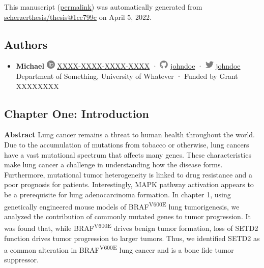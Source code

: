 This manuscript
(\href{https://scherzerthesis.github.io/thesis/v/1cc799cb76b18c366955ca819339505f0e3d53de/}{permalink})
was automatically generated
from \href{https://github.com/scherzerthesis/thesis/tree/1cc799cb76b18c366955ca819339505f0e3d53de}{scherzerthesis/thesis@1cc799c}
on April 5, 2022.

\hypertarget{authors}{%
\subsection{Authors}\label{authors}}

\begin{itemize}
\tightlist
\item
  \textbf{Michael}
  \includegraphics[width=0.16667in,height=0.16667in]{images/orcid.svg}
  \href{https://orcid.org/XXXX-XXXX-XXXX-XXXX}{XXXX-XXXX-XXXX-XXXX}
  · \includegraphics[width=0.16667in,height=0.16667in]{images/github.svg}
  \href{https://github.com/johndoe}{johndoe}
  · \includegraphics[width=0.16667in,height=0.16667in]{images/twitter.svg}
  \href{https://twitter.com/johndoe}{johndoe}
  Department of Something, University of Whatever
  · Funded by Grant XXXXXXXX
\end{itemize}

\hypertarget{chapter-one-introduction}{%
\subsection{Chapter One: Introduction}\label{chapter-one-introduction}}

\textbf{Abstract}
Lung cancer remains a threat to human health throughout the world. Due to the accumulation of mutations from tobacco or otherwise, lung cancers have a vast mutational spectrum that affects many genes. These characteristics make lung cancer a challenge in understanding how the disease forms. Furthermore, mutational tumor heterogeneity is linked to drug resistance and a poor prognosis for patients. Interestingly, MAPK pathway activation appears to be a prerequisite for lung adenocarcinoma formation. In chapter 1, using genetically engineered mouse models of BRAF\textsuperscript{V600E} lung tumorigenesis, we analyzed the contribution of commonly mutated genes to tumor progression. It was found that, while BRAF\textsuperscript{V600E} drives benign tumor formation, loss of SETD2 function drives tumor progression to larger tumors. Thus, we identified SETD2 as a common alteration in BRAF\textsuperscript{V600E} lung cancer and is a bone fide tumor suppressor.

